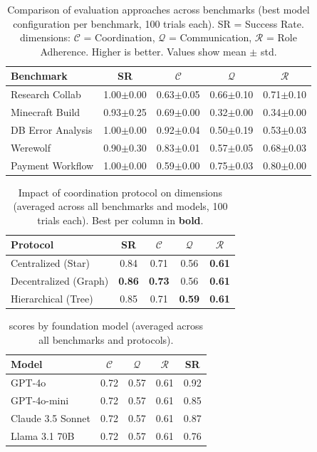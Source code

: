 \begin{table}[t]
\caption{Comparison of evaluation approaches across benchmarks (best model configuration per benchmark, 100 trials each). SR = Success Rate. \framework{} dimensions: $\mathcal{C}$ = Coordination, $\mathcal{Q}$ = Communication, $\mathcal{R}$ = Role Adherence. Higher is better. Values show mean $\pm$ std.}
\label{tab:main_results}
\centering
\begin{tabular}{@{}lc|ccc@{}}
\toprule
\textbf{Benchmark} & \textbf{SR} & $\mathcal{C}$ & $\mathcal{Q}$ & $\mathcal{R}$ \\
\midrule
Research Collab & 1.00$\pm$0.00 & 0.63$\pm$0.05 & 0.66$\pm$0.10 & 0.71$\pm$0.10 \\
Minecraft Build & 0.93$\pm$0.25 & 0.69$\pm$0.00 & 0.32$\pm$0.00 & 0.34$\pm$0.00 \\
DB Error Analysis & 1.00$\pm$0.00 & 0.92$\pm$0.04 & 0.50$\pm$0.19 & 0.53$\pm$0.03 \\
Werewolf & 0.90$\pm$0.30 & 0.83$\pm$0.01 & 0.57$\pm$0.05 & 0.68$\pm$0.03 \\
Payment Workflow & 1.00$\pm$0.00 & 0.59$\pm$0.00 & 0.75$\pm$0.03 & 0.80$\pm$0.00 \\
\bottomrule
\end{tabular}
\end{table}

\begin{table}[t]
\caption{Impact of coordination protocol on \framework{} dimensions (averaged across all benchmarks and models, 100 trials each). Best per column in \textbf{bold}.}
\label{tab:protocol}
\centering
\begin{tabular}{@{}lcccc@{}}
\toprule
\textbf{Protocol} & \textbf{SR} & $\mathcal{C}$ & $\mathcal{Q}$ & $\mathcal{R}$ \\
\midrule
Centralized (Star) & 0.84 & 0.71 & 0.56 & \textbf{0.61} \\
Decentralized (Graph) & \textbf{0.86} & \textbf{0.73} & 0.56 & \textbf{0.61} \\
Hierarchical (Tree) & 0.85 & 0.71 & \textbf{0.59} & \textbf{0.61} \\
\bottomrule
\end{tabular}
\end{table}

\begin{table}[h]
\centering
\caption{\framework{} scores by foundation model (averaged across all benchmarks and protocols).}
\label{tab:permodel}
\begin{tabular}{@{}lcccc@{}}
\toprule
\textbf{Model} & $\mathcal{C}$ & $\mathcal{Q}$ & $\mathcal{R}$ & \textbf{SR} \\
\midrule
GPT-4o & 0.72 & 0.57 & 0.61 & 0.92 \\
GPT-4o-mini & 0.72 & 0.57 & 0.61 & 0.85 \\
Claude 3.5 Sonnet & 0.72 & 0.57 & 0.61 & 0.87 \\
Llama 3.1 70B & 0.72 & 0.57 & 0.61 & 0.76 \\
\bottomrule
\end{tabular}
\end{table}


